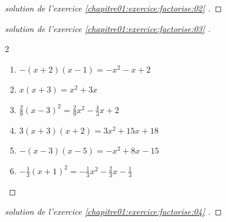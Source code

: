 \documentclass[main.tex]{subfiles}
\begin{document}
\begin{proof}[solution de l'exercice \ref{chapitre01:exercice:factorise:02} ]
\end{proof}
\begin{proof}[solution de l'exercice \ref{chapitre01:exercice:factorise:03} ]  \hfill
\begin{multicols}{2} 
	\begin{enumerate}[label={$f_\arabic*(x)=$\rule{0pt}{1.8em}}, leftmargin=*] 
		\item $-(x+2)(x-1)= -x^2-x+2$ 
		\item $x(x+3) = x^2+3x $ 
		\item $\tfrac{2}{9}(x-3)^2=\tfrac{2}{9}x^2-\tfrac{4}{3}x+2$ 
		\item $3(x+3)(x+2)=3x^2+15x+18  $
		\item $-(x-3)(x-5)=-x^2+8x-15$
		\item $-\tfrac{1}{3}(x+1)^2=-\tfrac{1}{3}x^2-\tfrac{2}{3}x-\tfrac{1}{3}$ 
	\end{enumerate}
\end{multicols} 
\end{proof}
\begin{proof}[solution de l'exercice \ref{chapitre01:exercice:factorise:04} ]  \hfill
	
	
\end{proof}
\end{document}
